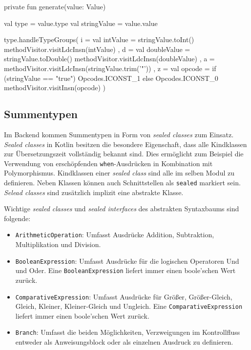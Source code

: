 \begin{KotlinCode}[numbers=none, caption={\texttt{generate} Funktion, welche Wert-Literale erzeugt.}, label=lst:impl_generateexample]
private fun generate(value: Value) {
    val type = value.type
    val stringValue = value.value

    type.handleTypeGroups(
        i = {
            val intValue = stringValue.toInt()
            methodVisitor.visitLdcInsn(intValue)
        },
        d = {
            val doubleValue = stringValue.toDouble()
            methodVisitor.visitLdcInsn(doubleValue)
        },
        a = { methodVisitor.visitLdcInsn(stringValue.trim('"')) },
        z = {
            val opcode = if (stringValue == "true") Opcodes.ICONST_1 else Opcodes.ICONST_0
            methodVisitor.visitInsn(opcode)
        }
    )
}
\end{KotlinCode}

\subsection{Summentypen}

Im Backend kommen Summentypen in Form von \textit{sealed classes} zum Einsatz. \textit{Sealed classes} in Kotlin besitzen die besondere Eigenschaft, dass alle Kindklassen zur Übersetzungszeit vollständig bekannt sind. Dies ermöglicht zum Beispiel die Verwendung von erschöpfenden \texttt{when}-Ausdrücken in Kombination mit Polymorphismus. Kindklassen einer \textit{sealed class} sind alle im selben Modul zu definieren. Neben Klassen können auch Schnittstellen als \texttt{sealed} markiert sein. \textit{Selead classes} sind zusätzlich implizit eine abstrakte Klasse.

Wichtige \textit{sealed classes} und \textit{sealed interfaces} des abstrakten Syntaxbaums sind folgende:

\begin{itemize}
    \item \texttt{ArithmeticOperation}: Umfasst Ausdrücke Addition, Subtraktion, Multiplikation und Division.
    \item \texttt{BooleanExpression}: Umfasst Ausdrücke für die logischen Operatoren Und und Oder. Eine \texttt{BooleanExpression} liefert immer einen boole'schen Wert zurück.
    \item \texttt{ComparativeExpression}: Umfasst Ausdrücke für Größer, Größer-Gleich, Gleich, Kleiner, Kleiner-Gleich und Ungleich. Eine \texttt{ComparativeExpression} liefert immer einen boole'schen Wert zurück.
    \item \texttt{Branch}: Umfasst die beiden Möglichkeiten, Verzweigungen im Kontrollfluss entweder als Anweisungsblock oder als einzelnen Ausdruck zu definieren.
\end{itemize}

